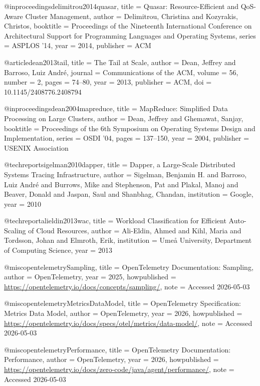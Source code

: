 @inproceedings{delimitrou2014quasar,
  title        = {Quasar: Resource-Efficient and QoS-Aware Cluster Management},
  author       = {Delimitrou, Christina and Kozyrakis, Christos},
  booktitle    = {Proceedings of the Nineteenth International Conference on Architectural Support for Programming Languages and Operating Systems},
  series       = {ASPLOS '14},
  year         = {2014},
  publisher    = {ACM}
}

@article{dean2013tail,
  title        = {The Tail at Scale},
  author       = {Dean, Jeffrey and Barroso, Luiz Andr{\'e}},
  journal      = {Communications of the ACM},
  volume       = {56},
  number       = {2},
  pages        = {74--80},
  year         = {2013},
  publisher    = {ACM},
  doi          = {10.1145/2408776.2408794}
}

@inproceedings{dean2004mapreduce,
  title        = {MapReduce: Simplified Data Processing on Large Clusters},
  author       = {Dean, Jeffrey and Ghemawat, Sanjay},
  booktitle    = {Proceedings of the 6th Symposium on Operating Systems Design and Implementation},
  series       = {OSDI '04},
  pages        = {137--150},
  year         = {2004},
  publisher    = {USENIX Association}
}

@techreport{sigelman2010dapper,
  title        = {Dapper, a Large-Scale Distributed Systems Tracing Infrastructure},
  author       = {Sigelman, Benjamin H. and Barroso, Luiz Andr{\'e} and Burrows, Mike and Stephenson, Pat and Plakal, Manoj and Beaver, Donald and Jaspan, Saul and Shanbhag, Chandan},
  institution  = {Google},
  year         = {2010}
}

@techreport{alieldin2013wac,
  title        = {Workload Classification for Efficient Auto-Scaling of Cloud Resources},
  author       = {Ali-Eldin, Ahmed and Kihl, Maria and Tordsson, Johan and Elmroth, Erik},
  institution  = {Ume{\aa} University, Department of Computing Science},
  year         = {2013}
}

@misc{opentelemetrySampling,
  title        = {OpenTelemetry Documentation: Sampling},
  author       = {{OpenTelemetry}},
  year         = {2025},
  howpublished = {\url{https://opentelemetry.io/docs/concepts/sampling/}},
  note         = {Accessed 2026-05-03}
}

@misc{opentelemetryMetricsDataModel,
  title        = {OpenTelemetry Specification: Metrics Data Model},
  author       = {{OpenTelemetry}},
  year         = {2026},
  howpublished = {\url{https://opentelemetry.io/docs/specs/otel/metrics/data-model/}},
  note         = {Accessed 2026-05-03}
}

@misc{opentelemetryPerformance,
  title        = {OpenTelemetry Documentation: Performance},
  author       = {{OpenTelemetry}},
  year         = {2026},
  howpublished = {\url{https://opentelemetry.io/docs/zero-code/java/agent/performance/}},
  note         = {Accessed 2026-05-03}
}